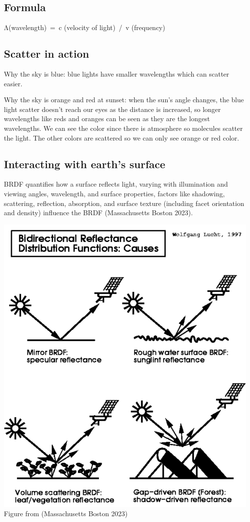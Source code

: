 \documentclass[
  letterpaper,
  DIV=11,
  numbers=noendperiod]{scrreprt}
\begin{document}
\subsection{Formula}\label{formula}

Λ(wavelength)~=~c (velocity of light)~/~v (frequency)

\subsection{Scatter in action}\label{scatter-in-action}

Why the sky is blue: blue lights have smaller wavelengths which can
scatter easier.

Why the sky is orange and red at sunset: when the sun's angle changes,
the blue light scatter doesn't reach our eyes as the distance is
increased, so longer wavelengths like reds and oranges can be seen as
they are the longest wavelengths. We can see the color since there is
atmosphere so molecules scatter the light. The other colors are
scattered so we can only see orange or red color.

\subsection{Interacting with earth's
surface}\label{interacting-with-earths-surface}

BRDF quantifies how a surface reflects light, varying with illumination
and viewing angles, wavelength, and surface properties, factors like
shadowing, scattering, reflection, absorption, and surface texture
(including facet orientation and density) influence the BRDF
(Massachusetts Boston 2023).

\includegraphics[width=5.20833in,height=\textheight]{BRDF.png} Figure
from (Massachusetts Boston 2023)
\end{document}
